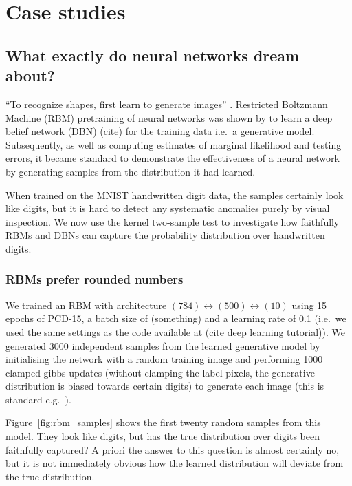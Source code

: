 \documentclass{article}
\def\ie{i.e.\ }
\def\eg{e.g.\ }
\begin{document}
\section{Case studies}

\subsection{What exactly do neural networks dream about?}

``To recognize shapes, first learn to generate images'' \cite{Hinton2007}.
Restricted Boltzmann Machine (RBM) pretraining of neural networks was shown by \cite{Hinton2006} to learn a deep belief network (DBN) (cite) for the training data \ie a generative model.
Subsequently, as well as computing estimates of marginal likelihood and testing errors, it became standard to demonstrate the effectiveness of a neural network by generating samples from the distribution it had learned.

When trained on the MNIST handwritten digit data, the samples certainly look like digits, but it is hard to detect any systematic anomalies purely by visual inspection.
We now use the kernel two-sample test to investigate how faithfully RBMs and DBNs can capture the probability distribution over handwritten digits.

\subsubsection{RBMs prefer rounded numbers}

We trained an RBM with architecture $(784)\leftrightarrow(500)\leftrightarrow(10)$ using 15 epochs of PCD-15, a batch size of (something) and a learning rate of 0.1 (\ie we used the same settings as the code available at (cite deep learning tutorial)).
We generated 3000 independent samples from the learned generative model by initialising the network with a random training image and performing 1000 clamped gibbs updates (without clamping the label pixels, the generative distribution is biased towards certain digits) to generate each image (this is standard \eg \cite{Hinton2007}).

Figure~\ref{fig:rbm_samples} shows the first twenty random samples from this model.
They look like digits, but has the true distribution over digits been faithfully captured?
A priori the answer to this question is almost certainly no, but it is not immediately obvious how the learned distribution will deviate from the true distribution.
\end{document}
